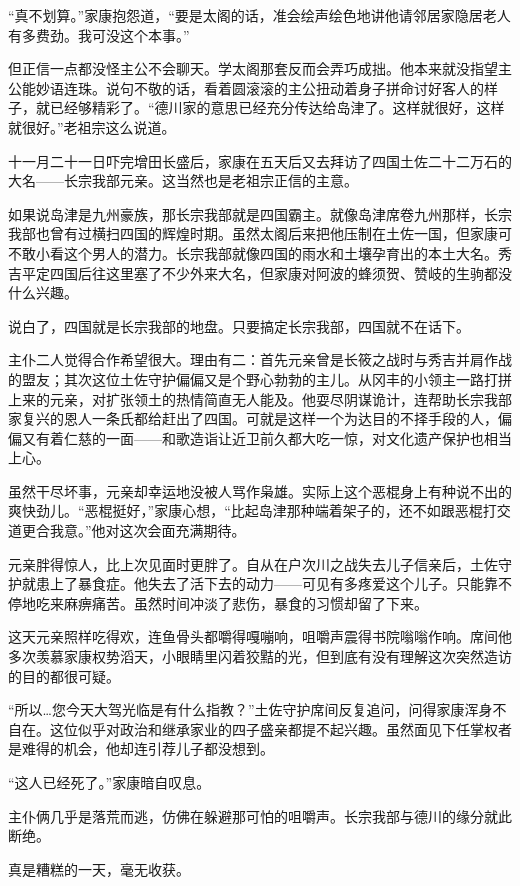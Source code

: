 \documentclass[
]{book}
\begin{document}
``真不划算。''家康抱怨道，``要是太阁的话，准会绘声绘色地讲他请邻居家隐居老人有多费劲。我可没这个本事。''

但正信一点都没怪主公不会聊天。学太阁那套反而会弄巧成拙。他本来就没指望主公能妙语连珠。说句不敬的话，看着圆滚滚的主公扭动着身子拼命讨好客人的样子，就已经够精彩了。``德川家的意思已经充分传达给岛津了。这样就很好，这样就很好。''老祖宗这么说道。

十一月二十一日吓完增田长盛后，家康在五天后又去拜访了四国土佐二十二万石的大名------长宗我部元亲。这当然也是老祖宗正信的主意。

如果说岛津是九州豪族，那长宗我部就是四国霸主。就像岛津席卷九州那样，长宗我部也曾有过横扫四国的辉煌时期。虽然太阁后来把他压制在土佐一国，但家康可不敢小看这个男人的潜力。长宗我部就像四国的雨水和土壤孕育出的本土大名。秀吉平定四国后往这里塞了不少外来大名，但家康对阿波的蜂须贺、赞岐的生驹都没什么兴趣。

说白了，四国就是长宗我部的地盘。只要搞定长宗我部，四国就不在话下。

主仆二人觉得合作希望很大。理由有二：首先元亲曾是长筱之战时与秀吉并肩作战的盟友；其次这位土佐守护偏偏又是个野心勃勃的主儿。从冈丰的小领主一路打拼上来的元亲，对扩张领土的热情简直无人能及。他耍尽阴谋诡计，连帮助长宗我部家复兴的恩人一条氏都给赶出了四国。可就是这样一个为达目的不择手段的人，偏偏又有着仁慈的一面------和歌造诣让近卫前久都大吃一惊，对文化遗产保护也相当上心。

虽然干尽坏事，元亲却幸运地没被人骂作枭雄。实际上这个恶棍身上有种说不出的爽快劲儿。``恶棍挺好，''家康心想，``比起岛津那种端着架子的，还不如跟恶棍打交道更合我意。''他对这次会面充满期待。

元亲胖得惊人，比上次见面时更胖了。自从在户次川之战失去儿子信亲后，土佐守护就患上了暴食症。他失去了活下去的动力------可见有多疼爱这个儿子。只能靠不停地吃来麻痹痛苦。虽然时间冲淡了悲伤，暴食的习惯却留了下来。

这天元亲照样吃得欢，连鱼骨头都嚼得嘎嘣响，咀嚼声震得书院嗡嗡作响。席间他多次羡慕家康权势滔天，小眼睛里闪着狡黠的光，但到底有没有理解这次突然造访的目的都很可疑。

``所以\ldots 您今天大驾光临是有什么指教？''土佐守护席间反复追问，问得家康浑身不自在。这位似乎对政治和继承家业的四子盛亲都提不起兴趣。虽然面见下任掌权者是难得的机会，他却连引荐儿子都没想到。

``这人已经死了。''家康暗自叹息。

主仆俩几乎是落荒而逃，仿佛在躲避那可怕的咀嚼声。长宗我部与德川的缘分就此断绝。

真是糟糕的一天，毫无收获。
\end{document}
